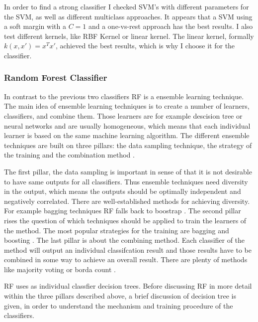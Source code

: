 \documentclass[12pt, a4paper, titlepage]{article}
\begin{document}
In order to find a strong classifier I checked \ac{SVM}'s with different parameters for the \ac{SVM}, as well as different multiclass approaches. It appears that a SVM using a soft margin with a $C=1$ and a one-vs-rest approach has the best results. I also test different kernels, like  RBF Kernel or linear kernel. The linear kernel, formally  $k(x, x') = x^Tx'$, achieved the best results, which is why I choose it for the classifier. 


\subsubsection{Random Forest Classifier}
In contrast to the previous two classifiers \ac{RF} is a ensemble learning technique. The main idea of ensemble learning techniques is to create a number of learners, classifiers, and combine them. Those learners are for example descision tree or neural networks and are usually homogeneous, which means that each individual learner is based on the same machine learning algorithm. The different ensemble techniques are built on three pillars: the data sampling technique, the strategy of the training and the combination method \cite{polikar2012, zhou2009}. 

The first pillar, the data sampling is important in sense of that it is not desirable to have same outputs for all classifiers. Thus ensemble techniques need diversity in the output, which means the outputs should be optimally independent and negatively correlated. There are well-established methods for achieving diversity. For example bagging techniques \ac{RF} falls back to boostrap \citep{polikar2012}. The second pillar rises the question of which techniques should be applied to train the learners of the method. The most popular strategies for the training are bagging and boosting \citep{polikar2012}. The last pillar is about the combining method. Each classifier of the method will output an individual classifcation result and those results have to be combined in some way to achieve an overall result. There are plenty of methods like majority voting or borda count \citep{polikar2012}.

\ac{RF} uses as individual classfier decision trees. Before discussing \ac{RF} in more detail within the three pillars described above, a brief discussion of decision tree is given, in order to understand the mechanism and training procedure of the classifiers. 
\end{document}
